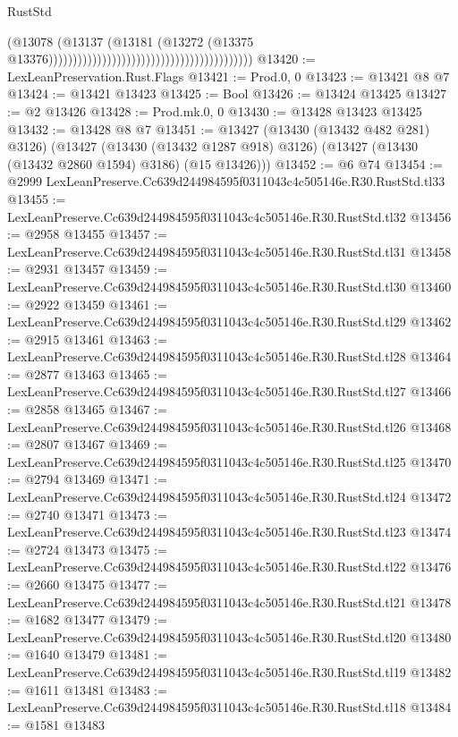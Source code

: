 \begin{lexlean}{RustStd}
\begin{coremodule}
                                                                              (@13078
                                                                                (@13137
                                                                                  (@13181
                                                                                    (@13272
                                                                                      (@13375
                                                                                        @13376))))))))))))))))))))))))))))))))))))))))))
@13420 := LexLeanPreservation.Rust.Flags
@13421 := Prod.{0, 0}
@13423 := @13421 @8 @7
@13424 := @13421 @13423
@13425 := Bool
@13426 := @13424 @13425
@13427 := @2 @13426
@13428 := Prod.mk.{0, 0}
@13430 := @13428 @13423 @13425
@13432 := @13428 @8 @7
@13451 := @13427
    (@13430 (@13432 @482 @281) @3126)
    (@13427
      (@13430 (@13432 @1287 @918) @3126)
      (@13427 (@13430 (@13432 @2860 @1594) @3186) (@15 @13426)))
@13452 := @6 @74
@13454 := @2999 LexLeanPreserve.Cc639d244984595f0311043c4c505146e.R30.RustStd.tl33
@13455 := LexLeanPreserve.Cc639d244984595f0311043c4c505146e.R30.RustStd.tl32
@13456 := @2958 @13455
@13457 := LexLeanPreserve.Cc639d244984595f0311043c4c505146e.R30.RustStd.tl31
@13458 := @2931 @13457
@13459 := LexLeanPreserve.Cc639d244984595f0311043c4c505146e.R30.RustStd.tl30
@13460 := @2922 @13459
@13461 := LexLeanPreserve.Cc639d244984595f0311043c4c505146e.R30.RustStd.tl29
@13462 := @2915 @13461
@13463 := LexLeanPreserve.Cc639d244984595f0311043c4c505146e.R30.RustStd.tl28
@13464 := @2877 @13463
@13465 := LexLeanPreserve.Cc639d244984595f0311043c4c505146e.R30.RustStd.tl27
@13466 := @2858 @13465
@13467 := LexLeanPreserve.Cc639d244984595f0311043c4c505146e.R30.RustStd.tl26
@13468 := @2807 @13467
@13469 := LexLeanPreserve.Cc639d244984595f0311043c4c505146e.R30.RustStd.tl25
@13470 := @2794 @13469
@13471 := LexLeanPreserve.Cc639d244984595f0311043c4c505146e.R30.RustStd.tl24
@13472 := @2740 @13471
@13473 := LexLeanPreserve.Cc639d244984595f0311043c4c505146e.R30.RustStd.tl23
@13474 := @2724 @13473
@13475 := LexLeanPreserve.Cc639d244984595f0311043c4c505146e.R30.RustStd.tl22
@13476 := @2660 @13475
@13477 := LexLeanPreserve.Cc639d244984595f0311043c4c505146e.R30.RustStd.tl21
@13478 := @1682 @13477
@13479 := LexLeanPreserve.Cc639d244984595f0311043c4c505146e.R30.RustStd.tl20
@13480 := @1640 @13479
@13481 := LexLeanPreserve.Cc639d244984595f0311043c4c505146e.R30.RustStd.tl19
@13482 := @1611 @13481
@13483 := LexLeanPreserve.Cc639d244984595f0311043c4c505146e.R30.RustStd.tl18
@13484 := @1581 @13483

\end{coremodule}
\end{lexlean}
